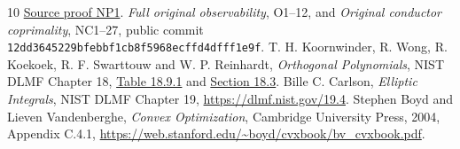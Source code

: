 \documentclass[11pt]{article}
\begin{document}
\begin{thebibliography}{10}
\href{https://github.com/KokunoYumeto/zeta-function-research-reader/blob/5992ad50c0f2a06921f1fcaded7b4e38097c0739/workbenches/splitzero-tandem/continuations/20260920-original-kernel-mixed-determinants/providers/NATIVE_PRECISION_AND_LEAKAGE.tex\#L36}{Source proof NP1}.
 \emph{Full original observability}, O1--12, and
\emph{Original conductor coprimality}, NC1--27, public commit
\texttt{12dd3645229bfebbf1cb8f5968ecffd4dfff1e9f}.
 T. H. Koornwinder, R. Wong, R. Koekoek, R. F. Swarttouw
and W. P. Reinhardt, \emph{Orthogonal Polynomials}, NIST DLMF Chapter 18,
\href{https://dlmf.nist.gov/18.9.T1}{Table 18.9.1} and
\href{https://dlmf.nist.gov/18.3}{Section 18.3}.
 Bille C. Carlson, \emph{Elliptic Integrals}, NIST DLMF
Chapter 19, \url{https://dlmf.nist.gov/19.4}.
 Stephen Boyd and Lieven Vandenberghe,
\emph{Convex Optimization}, Cambridge University Press, 2004, Appendix C.4.1,
\url{https://web.stanford.edu/~boyd/cvxbook/bv_cvxbook.pdf}.
\end{thebibliography}
\end{document}
